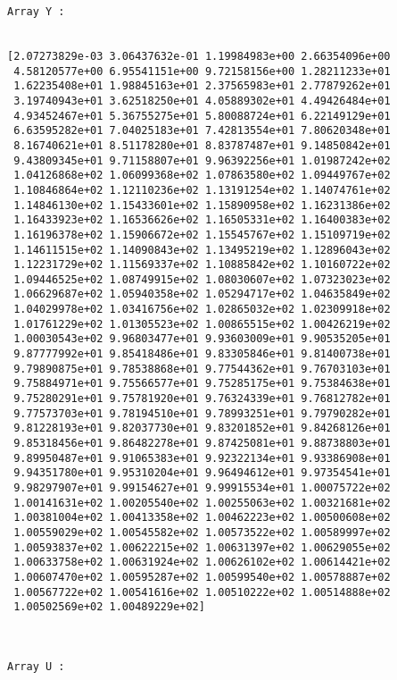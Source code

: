 \documentclass[11pt]{article}
\begin{document}
    \begin{Verbatim}[commandchars=\\\{\}]
Array Y : 


[2.07273829e-03 3.06437632e-01 1.19984983e+00 2.66354096e+00
 4.58120577e+00 6.95541151e+00 9.72158156e+00 1.28211233e+01
 1.62235408e+01 1.98845163e+01 2.37565983e+01 2.77879262e+01
 3.19740943e+01 3.62518250e+01 4.05889302e+01 4.49426484e+01
 4.93452467e+01 5.36755275e+01 5.80088724e+01 6.22149129e+01
 6.63595282e+01 7.04025183e+01 7.42813554e+01 7.80620348e+01
 8.16740621e+01 8.51178280e+01 8.83787487e+01 9.14850842e+01
 9.43809345e+01 9.71158807e+01 9.96392256e+01 1.01987242e+02
 1.04126868e+02 1.06099368e+02 1.07863580e+02 1.09449767e+02
 1.10846864e+02 1.12110236e+02 1.13191254e+02 1.14074761e+02
 1.14846130e+02 1.15433601e+02 1.15890958e+02 1.16231386e+02
 1.16433923e+02 1.16536626e+02 1.16505331e+02 1.16400383e+02
 1.16196378e+02 1.15906672e+02 1.15545767e+02 1.15109719e+02
 1.14611515e+02 1.14090843e+02 1.13495219e+02 1.12896043e+02
 1.12231729e+02 1.11569337e+02 1.10885842e+02 1.10160722e+02
 1.09446525e+02 1.08749915e+02 1.08030607e+02 1.07323023e+02
 1.06629687e+02 1.05940358e+02 1.05294717e+02 1.04635849e+02
 1.04029978e+02 1.03416756e+02 1.02865032e+02 1.02309918e+02
 1.01761229e+02 1.01305523e+02 1.00865515e+02 1.00426219e+02
 1.00030543e+02 9.96803477e+01 9.93603009e+01 9.90535205e+01
 9.87777992e+01 9.85418486e+01 9.83305846e+01 9.81400738e+01
 9.79890875e+01 9.78538868e+01 9.77544362e+01 9.76703103e+01
 9.75884971e+01 9.75566577e+01 9.75285175e+01 9.75384638e+01
 9.75280291e+01 9.75781920e+01 9.76324339e+01 9.76812782e+01
 9.77573703e+01 9.78194510e+01 9.78993251e+01 9.79790282e+01
 9.81228193e+01 9.82037730e+01 9.83201852e+01 9.84268126e+01
 9.85318456e+01 9.86482278e+01 9.87425081e+01 9.88738803e+01
 9.89950487e+01 9.91065383e+01 9.92322134e+01 9.93386908e+01
 9.94351780e+01 9.95310204e+01 9.96494612e+01 9.97354541e+01
 9.98297907e+01 9.99154627e+01 9.99915534e+01 1.00075722e+02
 1.00141631e+02 1.00205540e+02 1.00255063e+02 1.00321681e+02
 1.00381004e+02 1.00413358e+02 1.00462223e+02 1.00500608e+02
 1.00559029e+02 1.00545582e+02 1.00573522e+02 1.00589997e+02
 1.00593837e+02 1.00622215e+02 1.00631397e+02 1.00629055e+02
 1.00633758e+02 1.00631924e+02 1.00626102e+02 1.00614421e+02
 1.00607470e+02 1.00595287e+02 1.00599540e+02 1.00578887e+02
 1.00567722e+02 1.00541616e+02 1.00510222e+02 1.00514888e+02
 1.00502569e+02 1.00489229e+02]



Array U : 



\end{Verbatim}
\end{document}
